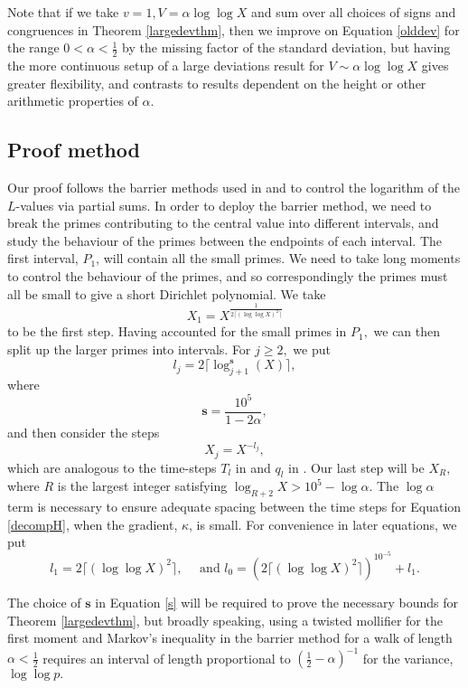 \documentclass[12pt]{amsart}
\numberwithin{equation}{section}
\numberwithin{thm}{section}
\newcommand{\1}{\mathbf 1}
\begin{document}
Note that if we take $v=1,V=\alpha\log\log X$ and sum over all choices of signs and congruences  in Theorem \ref{largedevthm}, then we improve on Equation \eqref{olddev} for the range $0<\alpha<\frac{1}{2}$ by the missing factor of the standard deviation, but having the more continuous setup of a large deviations result for $V\sim\alpha\log\log X$ gives greater flexibility, and contrasts to results dependent on the height or other arithmetic properties of $\alpha$.

\subsection{Proof method} Our proof follows the barrier methods used in \cite{AB24} and \cite{AC25} to control the logarithm of the $L$-values via partial sums. 
In order to deploy the barrier method, we need to break the primes contributing to the central value into different intervals, and study the behaviour of the primes between the endpoints of each interval. The first interval, $P_1$, will contain all the small primes. We need to take long moments to control the behaviour of the primes, and so correspondingly the primes must all be small to give a short Dirichlet polynomial. We take $$X_1=X^{\frac{1}{2\lceil(\log\log X)^2\rceil}}$$ to be the first step. Having accounted for the small primes in $P_1,$ we can then split up the larger primes into intervals. For $j\ge 2,$ we put $$l_j=2\lceil\log^{\mathbf{s}}_{j+1}(X)\rceil,$$ where
\begin{equation}\label{s}
	\mathbf{s}=\frac{10^5}{1-2\alpha},
\end{equation}  and then consider the steps $$X_j=X^{-l_j},$$ which are analogous to the time-steps $T_l$ in \cite{AB} and $q_l$ in \cite{AC25}.  Our last step will be $X_R,$ where $R$ is the largest integer satisfying $\log_{R+2}X>10^5-\log\alpha.$ The $\log\alpha$ term is necessary to ensure adequate spacing between the time steps for Equation \eqref{decompH}, when the gradient, $\kappa$, is small. For convenience in later equations, we put $$l_1=2\lceil(\log\log X)^2\rceil,\quad \text{ and }l_0=\left(2\lceil(\log\log X)^2\rceil\right)^{10^{-5}}+l_1.$$

The choice of $\mathbf{s}$ in Equation \eqref{s} will be required to prove the necessary bounds for Theorem \ref{largedevthm}, but broadly speaking, using a twisted mollifier for the first moment and Markov's inequality in the barrier method for a walk of length $\alpha<\frac{1}{2}$ requires an interval of length proportional to $\left(\frac{1}{2}-\alpha\right)^{-1}$ for the variance, $\log\log p.$    
\end{document}
